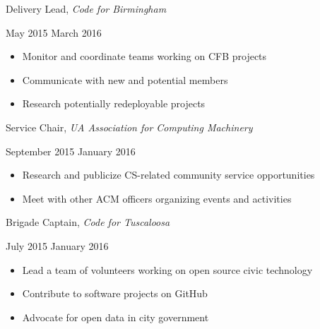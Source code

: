 \documentclass[11pt]{article}
\begin{document}
\vspace{0.4em}
\begin{minipage}[t]{0.65\textwidth}
\flushleft
Delivery Lead, \textit{Code for Birmingham}\\
\end{minipage}
\begin{minipage}[t]{0.30\textwidth}
\flushright
May 2015 \space \textemdash \space March 2016\\
\end{minipage}

\begin{itemize}
  \item Monitor and coordinate teams working on CFB projects
  \item Communicate with new and potential members
  \item Research potentially redeployable projects
\end{itemize}

\vspace{0.4em}
\begin{minipage}[t]{0.65\textwidth}
\flushleft
Service Chair, \textit{UA Association for Computing Machinery}\\
\end{minipage}
\begin{minipage}[t]{0.3\textwidth}
\flushright
September 2015 \space \textemdash \space January 2016\\
\end{minipage}

\begin{itemize}
  \item Research and publicize CS-related community service opportunities
  \item Meet with other ACM officers organizing events and activities
\end{itemize}

\begin{minipage}[t]{0.65\textwidth}
\flushleft
Brigade Captain, \textit{Code for Tuscaloosa}\\
\end{minipage}
\begin{minipage}[t]{0.30\textwidth}
\flushright
July 2015 \space \textemdash \space January 2016\\
\end{minipage}

\begin{itemize}
  \item Lead a team of volunteers working on open source civic technology
  \item Contribute to software projects on GitHub
  \item Advocate for open data in city government
\end{itemize}
\end{document}
